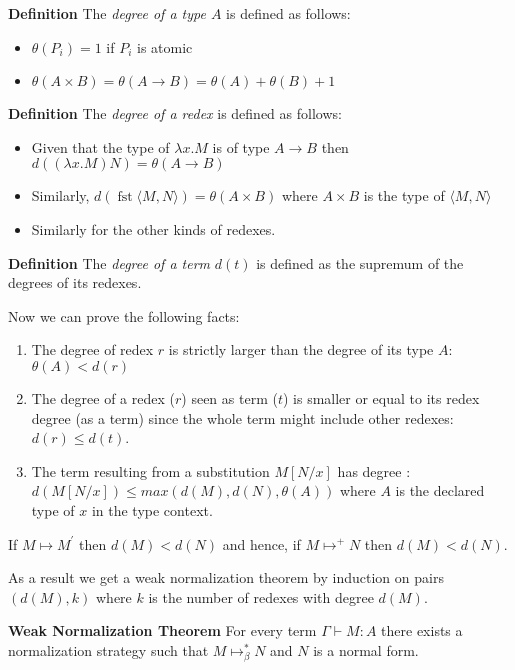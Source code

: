 \begin{mdframed}
	\textbf{Definition}
	The \textit{degree of a type $A$} is defined as follows:
	\begin{itemize}
		\item $\theta(P_i)=1$ if $P_i$ is atomic
		\item $\theta(A\times B)=\theta(A \rightarrow B)= \theta(A)+\theta(B)+1$
	\end{itemize}
\end{mdframed}
\begin{mdframed}
	\textbf{Definition}
	The \textit{degree of a redex} is defined as follows:
	\begin{itemize}
		\item  Given that the type of $\lambda x. M$ is of type $A\rightarrow B$ then  $d((\lambda x. M)N)=\theta(A\rightarrow B)$
		\item Similarly, $d(\operatorname{fst}\langle M, N\rangle)=\theta(A\times B)$
		where $A\times B$ is the type of $\langle M, N\rangle$
		
		\item Similarly for the other kinds of redexes.
	\end{itemize}
\end{mdframed}
\begin{mdframed}
	\textbf{Definition}
	The \textit{degree of a term} $d(t)$ is defined as the supremum of the degrees of its redexes.
\end{mdframed}
Now we can prove the following facts:
\begin{theorem}
	\begin{mdframed}
\begin{enumerate}
	\item The degree of redex $r$ is strictly larger than the degree of its type $A$: 
	$\theta(A)<d(r)$
	\item The degree of a redex ($r$) seen as term ($t$)  is smaller or equal to its redex degree (as a term) since the whole term might include other redexes: $d(r)\le d(t)$.
	\item The term resulting from a substitution $M[N/x]$  has degree : $d(M[N/x])\le max(d(M),d(N),\theta(A))$ where $A$ is the declared type of $x$ in the type context.
\end{enumerate}
	\end{mdframed}
\end{theorem}
\begin{mdframed}
	\begin{theorem}
If $M\mapsto M^{\prime}$ then $d(M)<d(N)$ and hence, if $M\mapsto^{+} N$ then $d(M)<d(N)$.
\end{theorem}
\end{mdframed}
As a result we get a weak  normalization theorem by induction on pairs $(d(M),k)$ where $k$ is the number of redexes with degree $d(M)$.
\begin{mdframed}
\begin{theorem}
	\textbf{Weak Normalization Theorem}
For every term $\Gamma\vdash M:A$ there exists a normalization strategy 
such that $M\mapsto_{\beta}^{*}N$ and $N$ is a normal form.
\end{theorem}
\end{mdframed} 

